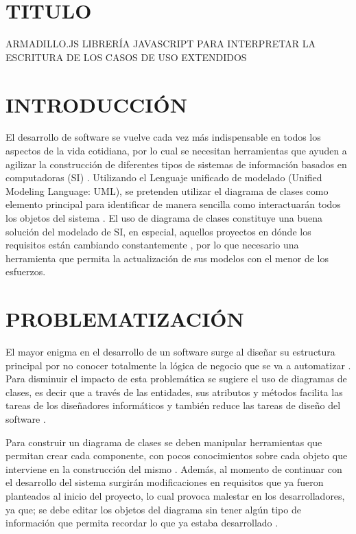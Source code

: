 \documentclass[12pt,a4paper,final]{article}
\begin{document}
	
	\section{TITULO}
	
	\par{ARMADILLO.JS LIBRERÍA JAVASCRIPT PARA INTERPRETAR LA ESCRITURA DE LOS CASOS DE USO EXTENDIDOS}
	
	\section{INTRODUCCIÓN}
	
	El desarrollo de software se vuelve cada vez más indispensable en todos los aspectos de la vida cotidiana, por lo cual se necesitan herramientas que ayuden a agilizar la construcción de diferentes tipos de sistemas de información basados en computadoras (SI) \cite{DeLone}. Utilizando el Lenguaje unificado de modelado (Unified Modeling Language: UML), se pretenden utilizar el diagrama de clases como elemento principal para identificar de manera sencilla como interactuarán todos los objetos del sistema \cite{UMLsequence}. El uso de diagrama de clases constituye una buena solución del modelado de SI, en especial, aquellos proyectos en dónde los requisitos están cambiando constantemente \cite{review}, por lo que necesario una herramienta que permita la actualización de sus modelos con el menor de los esfuerzos.
	
	\section{PROBLEMATIZACIÓN}
	
	El mayor enigma en el desarrollo de un software surge al diseñar su estructura principal por no conocer totalmente la lógica de negocio que se va a automatizar \cite{Weighted}.  Para disminuir el impacto de esta problemática se sugiere el uso de diagramas de clases, es decir que a través de las entidades, sus atributos y métodos facilita las tareas de los diseñadores informáticos y también reduce las tareas de diseño del software \cite{Management}.
	
	Para construir un diagrama de clases se deben manipular herramientas que permitan crear cada componente, con pocos conocimientos sobre cada objeto que interviene en la construcción del mismo \cite{Management}. Además, al momento de continuar con el desarrollo del sistema surgirán modificaciones en requisitos que ya fueron planteados al inicio del proyecto, lo cual provoca malestar en los desarrolladores, ya que; se debe editar los objetos del diagrama sin tener algún tipo de información que permita recordar lo que ya estaba desarrollado \cite{case}.
	
\end{document}
